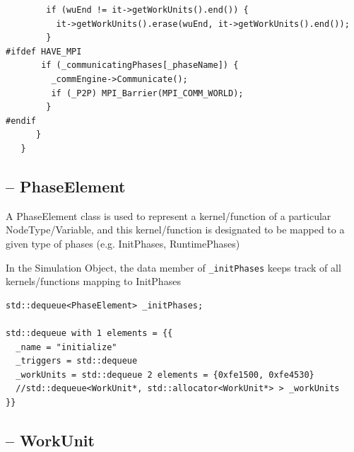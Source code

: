 \begin{lstlisting}
        if (wuEnd != it->getWorkUnits().end()) {                                                                 
          it->getWorkUnits().erase(wuEnd, it->getWorkUnits().end());                                            
        }                                                                                                        
#ifdef HAVE_MPI                                                                                               
       if (_communicatingPhases[_phaseName]) {                                                                  
         _commEngine->Communicate();                                                                            
         if (_P2P) MPI_Barrier(MPI_COMM_WORLD);                                                                 
        }                                                                                                        
#endif                                                                                                        
      }                                                                                                       
   }                                              
\end{lstlisting}

\subsection{-- PhaseElement}
\label{sec:PhaseElement}

A PhaseElement class is  used to represent a kernel/function of a particular
NodeType/Variable, and this kernel/function is designated to be mapped to a
given type of phases (e.g. InitPhases, RuntimePhases)

In the Simulation Object, the data member of \verb!_initPhases! keeps track of
all kernels/functions mapping to InitPhases
\begin{verbatim}
std::dequeue<PhaseElement> _initPhases;

std::dequeue with 1 elements = {{
  _name = "initialize"
  _triggers = std::dequeue
  _workUnits = std::dequeue 2 elements = {0xfe1500, 0xfe4530}
  //std::dequeue<WorkUnit*, std::allocator<WorkUnit*> > _workUnits
}}
\end{verbatim}

\subsection{-- WorkUnit}
\label{sec:WorkUnit-MGS}

